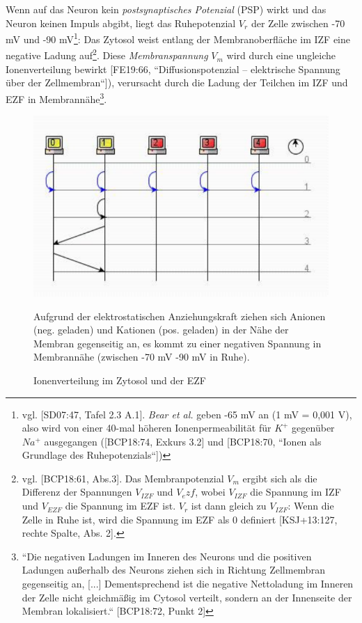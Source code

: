 {Wenn auf das Neuron kein \textit{postsynaptisches Potenzial} (PSP) wirkt und das Neuron keinen Impuls abgibt, liegt das Ruhepotenzial $V_r$ der Zelle zwischen -70 mV und -90 mV\footnote{
 vgl. {[SD07:47, Tafel 2.3 A.1]}. \textit{Bear et al.} geben -65 mV an (1 mV = 0,001 V), also wird von einer 40-mal höheren Ionenpermeabilität für $K^+$ gegenüber $Na^+$ ausgegangen ({[BCP18:74, Exkurs 3.2] und [BCP18:70, ``Ionen als Grundlage des Ruhepotenzials``]})
}: Das Zytosol weist entlang der Membranoberfläche im IZF eine negative Ladung auf\footnote{
 vgl. {[BCP18:61, Abs.3]}. Das Membranpotenzial $V_m$ ergibt sich als die Differenz der Spannungen $V_{IZF}$ und $V_ezf$, wobei $V_{IZF}$ die Spannung im IZF und $V_{EZF}$ die Spannung im EZF ist. $V_r$ ist dann gleich zu $V_{IZF}$: Wenn die Zelle in Ruhe ist, wird die Spannung im EZF als $0$ definiert {[KSJ+13:127, rechte Spalte, Abs. 2]}.
}.
Diese \textit{Membranspannung} $V_m$ wird durch eine ungleiche Ionenverteilung bewirkt [FE19:66, ``Diffusionspotenzial – elektrische Spannung über der Zellmembran``]), verursacht durch die Ladung der Teilchen im IZF und EZF in Membrannähe\footnote{
 ``Die negativen Ladungen im Inneren des Neurons und die positiven Ladungen außerhalb des Neurons ziehen sich in Richtung Zellmembran gegenseitig an, {[...]} Dementsprechend ist die negative Nettoladung im Inneren der Zelle nicht gleichmäßig im Cytosol verteilt, sondern an der Innenseite der Membran lokalisiert.`` {[BCP18:72, Punkt 2]}
}.


\begin{figure}[h]
 \centering
 \includegraphics{images/p1ReadSeq.pdf}
 \caption{Ionenverteilung im Zytosol und der EZF}
 \small
 Aufgrund der elektrostatischen Anziehungskraft ziehen sich Anionen (neg. geladen) und Kationen (pos. geladen) in der Nähe der Membran gegenseitig an, es kommt zu einer negativen Spannung in Membrannähe (zwischen -70 mV -90 mV in Ruhe).
\end{figure}

}

